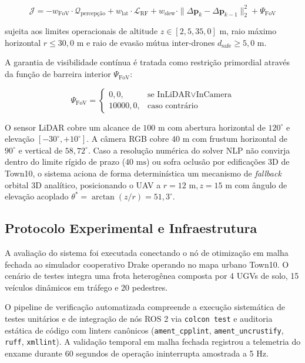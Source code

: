 \documentclass[
  brazilian,
  a4paper]{article}
\begin{document}
\[\mathcal{J} = - w_{\text{FoV}} \cdot \mathcal{Q}_{\text{percepção}} + w_{\text{lat}} \cdot \mathcal{L}_{\text{RF}} + w_{\text{slew}} \cdot \|\Delta \mathbf{p}_k - \Delta \mathbf{p}_{k-1}\|_2^2 + \Psi_{\text{FoV}}\]

sujeita aos limites operacionais de altitude
\(z \in [2{,}5, 35{,}0]\text{ m}\), raio máximo horizontal
\(r \le 30{,}0\text{ m}\) e raio de evasão mútua inter-drones
\(d_{\text{safe}} \ge 5{,}0\text{ m}\).

A garantia de visibilidade contínua é tratada como restrição primordial
através da função de barreira interior \(\Psi_{\text{FoV}}\):

\[\Psi_{\text{FoV}} = \begin{cases} 0{,}0, & \text{se } \text{InLiDAR} \lor \text{InCamera} \\ 10000{,}0, & \text{caso contrário} \end{cases}\]

O sensor LiDAR cobre um alcance de \(100\text{ m}\) com abertura
horizontal de \(120^\circ\) e elevação \([-30^\circ, +10^\circ]\). A
câmera RGB cobre \(40\text{ m}\) com frustum horizontal de \(90^\circ\)
e vertical de \(58{,}72^\circ\). Caso a resolução numérica do solver NLP
não convirja dentro do limite rígido de prazo (\(40\text{ ms}\)) ou
sofra oclusão por edificações 3D de Town10, o sistema aciona de forma
determinística um mecanismo de \emph{fallback} orbital 3D analítico,
posicionando o UAV a \(r = 12\text{ m}, z = 15\text{ m}\) com ângulo de
elevação acoplado \(\theta^* = \arctan(z/r) = 51{,}3^\circ\).

\subsection{Protocolo Experimental e
Infraestrutura}\label{protocolo-experimental-e-infraestrutura}

A avaliação do sistema foi executada conectando o nó de otimização em
malha fechada ao simulador cooperativo Drake operando no mapa urbano
Town10. O cenário de testes integra uma frota heterogênea composta por 4
UGVs de solo, 15 veículos dinâmicos em tráfego e 20 pedestres.

O pipeline de verificação automatizada compreende a execução sistemática
de testes unitários e de integração de nós ROS 2 via
\texttt{colcon\ test} e auditoria estática de código com linters
canônicos (\texttt{ament\_\allowbreak{}cpplint}, \texttt{ament\_\allowbreak{}uncrustify},
\texttt{ruff}, \texttt{xmllint}). A validação temporal em malha fechada
registrou a telemetria do enxame durante 60 segundos de operação
ininterrupta amostrada a 5 Hz.
\end{document}
